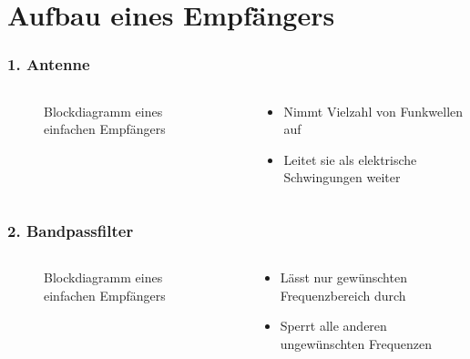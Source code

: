 
\section{Aufbau eines Empfängers}
\label{section:aufbau_empfaenger}
\begin{frame}%

\frametitle{1. Antenne}
\begin{columns}
    \begin{column}{0.48\textwidth}
    
\begin{figure}
    \caption{\scriptsize Blockdiagramm eines einfachen Empfängers}
    \label{aufbau_empfaenger_blockdiagramm}
\end{figure}


    \end{column}
   \begin{column}{0.48\textwidth}
       \begin{itemize}
  \item Nimmt Vielzahl von Funkwellen auf
  \item Leitet sie als elektrische Schwingungen weiter
  \end{itemize}

   \end{column}
\end{columns}

\end{frame}

\begin{frame}
\frametitle{2. Bandpassfilter}
\begin{columns}
    \begin{column}{0.48\textwidth}
    
\begin{figure}
    \caption{\scriptsize Blockdiagramm eines einfachen Empfängers}
    \label{aufbau_empfaenger_blockdiagramm}
\end{figure}


    \end{column}
   \begin{column}{0.48\textwidth}
       \begin{itemize}
  \item Lässt nur gewünschten Frequenzbereich durch
  \item Sperrt alle anderen ungewünschten Frequenzen
  \end{itemize}

   \end{column}
\end{columns}

\end{frame}

